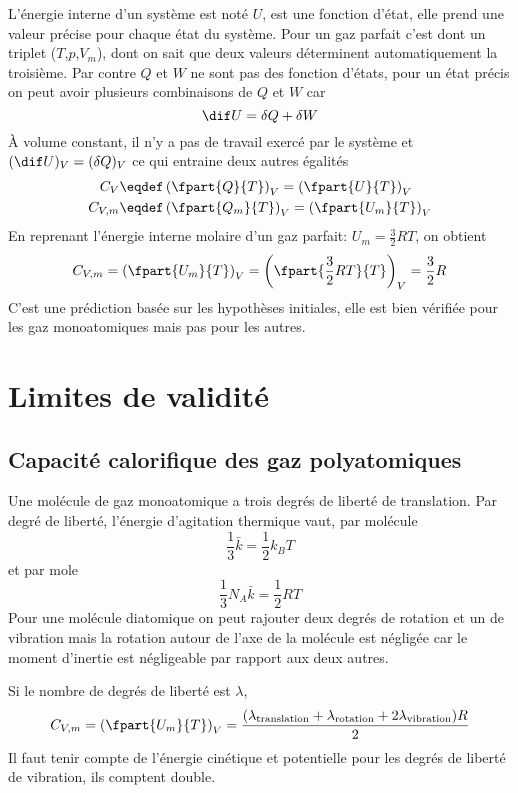 L'énergie interne d'un système est noté $U$, est une fonction d'état,
elle prend une valeur précise pour chaque état du système.
Pour un gaz parfait c'est dont un triplet ($T$,$p$,$V_m$),
dont on sait que deux valeurs déterminent automatiquement la troisième.
Par contre $Q$ et $W$ ne sont pas des fonction d'états,
pour un état précis on peut avoir plusieurs combinaisons de $Q$ et $W$ car
\[ \dif U = \delta Q + \delta W \]
À volume constant, il n'y a pas de travail exercé par le système et
$(\dif U)_V = (\delta Q)_V$ ce qui entraine deux autres égalités
\begin{align*}
  C_V & \eqdef \left(\fpart{Q}{T}\right)_V =
  \left(\fpart{U}{T}\right)_V\\
  C_{V,m} & \eqdef \left(\fpart{Q_m}{T}\right)_V =
  \left(\fpart{U_m}{T}\right)_V
\end{align*}
En reprenant l'énergie interne molaire d'un gaz parfait:
$U_m = \frac 32 RT$, on obtient
\[ C_{V,m} = \left(\fpart{U_m}{T}\right)_V =
\left(\fpart{\frac 32 RT}{T}\right)_V = \frac 32R \]
C'est une prédiction basée sur les hypothèses initiales,
elle est bien vérifiée pour les gaz monoatomiques mais pas pour les autres.

\section{Limites de validité}
\subsection{Capacité calorifique des gaz polyatomiques}
Une molécule de gaz monoatomique a trois degrés de liberté de translation.
Par degré de liberté, l'énergie d'agitation thermique vaut, par molécule
\[ \frac 13 \bar k = \frac 12 k_BT \]
et par mole
\[ \frac 13 N_A \bar k = \frac 12 RT \]
Pour une molécule diatomique on peut rajouter deux degrés de rotation et
un de vibration mais la rotation autour de l'axe de la molécule est négligée
car le moment d'inertie est négligeable par rapport aux deux autres.

Si le nombre de degrés de liberté est $\lambda$,
\[ C_{V,m} = \left(\fpart{U_m}{T}\right)_V =
\frac{(\lambda_\mathrm{translation} + \lambda_\mathrm{rotation} +
2\lambda_\mathrm{vibration})R}2 \]
Il faut tenir compte de l'énergie cinétique et potentielle
pour les degrés de liberté de vibration, ils comptent double.

